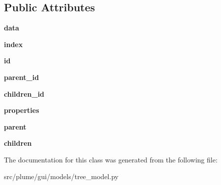 \subsection*{Public Attributes}
\begin{DoxyCompactItemize}
\item 
{\bfseries data}\hypertarget{classplume-creator_1_1src_1_1plume_1_1gui_1_1models_1_1tree__model_1_1_tree_item_aa301df00208cf5a76f3a51e6a7442d61}{}\label{classplume-creator_1_1src_1_1plume_1_1gui_1_1models_1_1tree__model_1_1_tree_item_aa301df00208cf5a76f3a51e6a7442d61}

\item 
{\bfseries index}\hypertarget{classplume-creator_1_1src_1_1plume_1_1gui_1_1models_1_1tree__model_1_1_tree_item_a8dfa3ece1c582b7909683bb03af22aff}{}\label{classplume-creator_1_1src_1_1plume_1_1gui_1_1models_1_1tree__model_1_1_tree_item_a8dfa3ece1c582b7909683bb03af22aff}

\item 
{\bfseries id}\hypertarget{classplume-creator_1_1src_1_1plume_1_1gui_1_1models_1_1tree__model_1_1_tree_item_ac708f513ded34dd8dda127b31924a488}{}\label{classplume-creator_1_1src_1_1plume_1_1gui_1_1models_1_1tree__model_1_1_tree_item_ac708f513ded34dd8dda127b31924a488}

\item 
{\bfseries parent\+\_\+id}\hypertarget{classplume-creator_1_1src_1_1plume_1_1gui_1_1models_1_1tree__model_1_1_tree_item_a477eca6c24b2d3f51c30a51a13d50ef9}{}\label{classplume-creator_1_1src_1_1plume_1_1gui_1_1models_1_1tree__model_1_1_tree_item_a477eca6c24b2d3f51c30a51a13d50ef9}

\item 
{\bfseries children\+\_\+id}\hypertarget{classplume-creator_1_1src_1_1plume_1_1gui_1_1models_1_1tree__model_1_1_tree_item_a1d69a6fad95713319082437326642d56}{}\label{classplume-creator_1_1src_1_1plume_1_1gui_1_1models_1_1tree__model_1_1_tree_item_a1d69a6fad95713319082437326642d56}

\item 
{\bfseries properties}\hypertarget{classplume-creator_1_1src_1_1plume_1_1gui_1_1models_1_1tree__model_1_1_tree_item_aa2a04cc057ac69b5d632394ed1b743d7}{}\label{classplume-creator_1_1src_1_1plume_1_1gui_1_1models_1_1tree__model_1_1_tree_item_aa2a04cc057ac69b5d632394ed1b743d7}

\item 
{\bfseries parent}\hypertarget{classplume-creator_1_1src_1_1plume_1_1gui_1_1models_1_1tree__model_1_1_tree_item_afaa4847a90d169ff7a6de29c6c9f2b83}{}\label{classplume-creator_1_1src_1_1plume_1_1gui_1_1models_1_1tree__model_1_1_tree_item_afaa4847a90d169ff7a6de29c6c9f2b83}

\item 
{\bfseries children}\hypertarget{classplume-creator_1_1src_1_1plume_1_1gui_1_1models_1_1tree__model_1_1_tree_item_a74bffb06e547ff148bb78e46d9753e8e}{}\label{classplume-creator_1_1src_1_1plume_1_1gui_1_1models_1_1tree__model_1_1_tree_item_a74bffb06e547ff148bb78e46d9753e8e}

\end{DoxyCompactItemize}


The documentation for this class was generated from the following file\+:\begin{DoxyCompactItemize}
\item 
src/plume/gui/models/tree\+\_\+model.\+py\end{DoxyCompactItemize}

